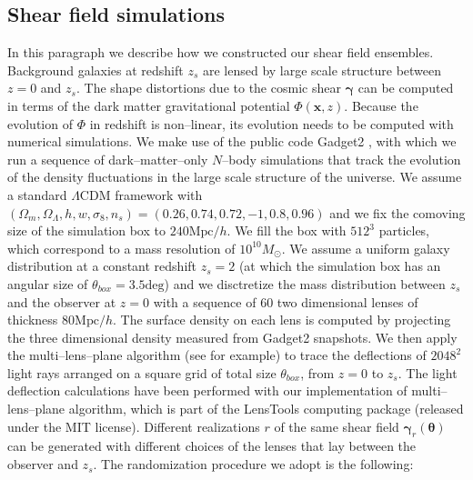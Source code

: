 \documentclass[reprint,aps,prd,superscriptaddress,showkeys,showpacs]{revtex4-1}
\newcommand{\bb}[1]{\mathbf{#1}}
\begin{document}
\subsection{Shear field simulations}
\label{shearsim}
%
In this paragraph we describe how we constructed our shear field ensembles. Background galaxies at redshift $z_s$ are lensed by large scale structure between $z=0$ and $z_s$. The shape distortions due to the cosmic shear $\pmb{\gamma}$ can be computed in terms of the dark matter gravitational potential $\Phi(\bb{x},z)$. Because the evolution of $\Phi$ in redshift is non--linear, its evolution needs to be computed with numerical simulations. We make use of the public code Gadget2 \citep{Gadget2}, with which we run a sequence of dark--matter--only $N$--body simulations that track the evolution of the density fluctuations in the large scale structure of the universe. We assume a standard $\Lambda$CDM framework with $(\Omega_m,\Omega_\Lambda,h,w,\sigma_8,n_s)=(0.26,0.74,0.72,-1,0.8,0.96)$ and we fix the comoving size of the simulation box to $240\mathrm{Mpc}/h$. We fill the box with $512^3$ particles, which correspond to a mass resolution of $10^{10}M_\odot$. We assume a uniform galaxy distribution at a constant redshift $z_s=2$ (at which the simulation box has an angular size of $\theta_{box}=3.5\mathrm{deg}$) and we disctretize the mass distribution between $z_s$ and the observer at $z=0$ with a sequence of 60 two dimensional lenses of thickness $80\mathrm{Mpc}/h$. The surface density on each lens is computed by projecting the three dimensional density measured from Gadget2 snapshots. We then apply the multi--lens--plane algorithm (see \citep{RayTracingHartlap,RayTracingJain} for example) to trace the deflections of $2048^2$ light rays arranged on a square grid of total size $\theta_{box}$, from $z=0$ to $z_s$. The light deflection calculations have been performed with our implementation of multi--lens--plane algorithm, which is part of the LensTools computing package \citep{LensTools} (released under the MIT license). Different realizations $r$ of the same shear field $\pmb{\gamma}_r(\pmb{\theta})$ can be generated with different choices of the lenses that lay between the observer and $z_s$. The randomization procedure we adopt is the following:
\end{document}
